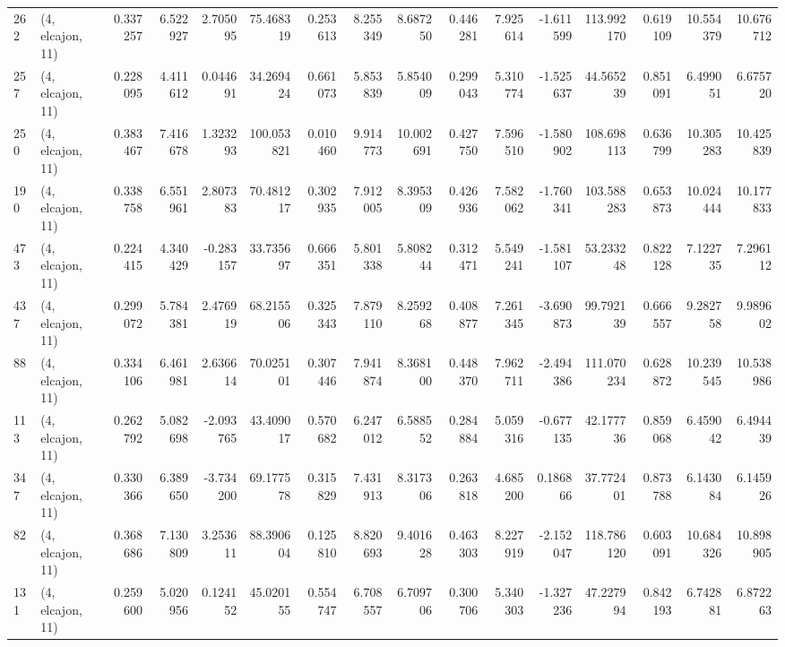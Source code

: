 \begin{tabular}{llrrrrrrrrrrrrrr}
262 &  (4, elcajon, 11) &   0.337257 &   6.522927 &   2.705095 &    75.468319 &   0.253613 &   8.255349 &   8.687250 &  0.446281 &   7.925614 &  -1.611599 &   113.992170 &  0.619109 &  10.554379 &  10.676712 \\
257 &  (4, elcajon, 11) &   0.228095 &   4.411612 &   0.044691 &    34.269424 &   0.661073 &   5.853839 &   5.854009 &  0.299043 &   5.310774 &  -1.525637 &    44.565239 &  0.851091 &   6.499051 &   6.675720 \\
250 &  (4, elcajon, 11) &   0.383467 &   7.416678 &   1.323293 &   100.053821 &   0.010460 &   9.914773 &  10.002691 &  0.427750 &   7.596510 &  -1.580902 &   108.698113 &  0.636799 &  10.305283 &  10.425839 \\
190 &  (4, elcajon, 11) &   0.338758 &   6.551961 &   2.807383 &    70.481217 &   0.302935 &   7.912005 &   8.395309 &  0.426936 &   7.582062 &  -1.760341 &   103.588283 &  0.653873 &  10.024444 &  10.177833 \\
473 &  (4, elcajon, 11) &   0.224415 &   4.340429 &  -0.283157 &    33.735697 &   0.666351 &   5.801338 &   5.808244 &  0.312471 &   5.549241 &  -1.581107 &    53.233248 &  0.822128 &   7.122735 &   7.296112 \\
437 &  (4, elcajon, 11) &   0.299072 &   5.784381 &   2.476919 &    68.215506 &   0.325343 &   7.879110 &   8.259268 &  0.408877 &   7.261345 &  -3.690873 &    99.792139 &  0.666557 &   9.282758 &   9.989602 \\
88  &  (4, elcajon, 11) &   0.334106 &   6.461981 &   2.636614 &    70.025101 &   0.307446 &   7.941874 &   8.368100 &  0.448370 &   7.962711 &  -2.494386 &   111.070234 &  0.628872 &  10.239545 &  10.538986 \\
113 &  (4, elcajon, 11) &   0.262792 &   5.082698 &  -2.093765 &    43.409017 &   0.570682 &   6.247012 &   6.588552 &  0.284884 &   5.059316 &  -0.677135 &    42.177736 &  0.859068 &   6.459042 &   6.494439 \\
347 &  (4, elcajon, 11) &   0.330366 &   6.389650 &  -3.734200 &    69.177578 &   0.315829 &   7.431913 &   8.317306 &  0.263818 &   4.685200 &   0.186866 &    37.772401 &  0.873788 &   6.143084 &   6.145926 \\
82  &  (4, elcajon, 11) &   0.368686 &   7.130809 &   3.253611 &    88.390604 &   0.125810 &   8.820693 &   9.401628 &  0.463303 &   8.227919 &  -2.152047 &   118.786120 &  0.603091 &  10.684326 &  10.898905 \\
131 &  (4, elcajon, 11) &   0.259600 &   5.020956 &   0.124152 &    45.020155 &   0.554747 &   6.708557 &   6.709706 &  0.300706 &   5.340303 &  -1.327236 &    47.227994 &  0.842193 &   6.742881 &   6.872263 \\

\end{tabular}
